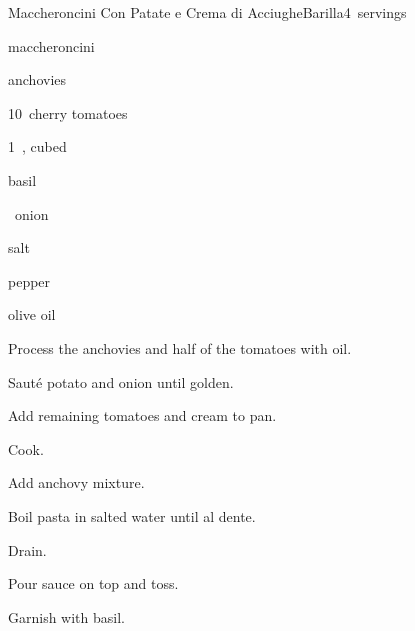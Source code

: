 \begin{recipe}{Maccheroncini Con Patate e Crema di Acciughe}{Barilla}{4~servings}

\begin{ingredients}
\item {} maccheroncini
\item {} anchovies
\item 10~cherry tomatoes
\item 1~, cubed
\item basil
\item {} 
\item \half~onion
\item salt
\item pepper
\item olive oil
\end{ingredients}

\begin{directions}
\item Process the anchovies and half of the tomatoes with oil.
\item Saut\'e potato and onion until golden.
\item Add remaining tomatoes and cream to pan.
\item Cook.
\item Add anchovy mixture.
\item Boil pasta in salted water until al dente.
\item Drain.
\item Pour sauce on top and toss.
\item Garnish with basil.
\end{directions}

\end{recipe}
